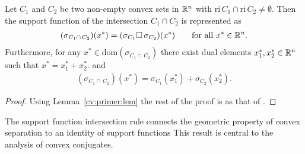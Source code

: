 \begin{theorem*}
  Let $C_1$ and $C_2$ be two non-empty convex sets in $\mathbb{R}^n$ with
  $\mathrm{ri}\,C_1\cap\mathrm{ri}\,C_2\neq\emptyset.$
  Then the support function of the intersection 
  $
    C_1\! \cap C_2
  $
  is represented as
  \begin{gather}
    (\sigma_{
    C_1 \cap\, C_2
    })
    (x^*)
    =
    (\sigma_{C_1}\square \,\sigma_{C_2})
    (x^*)
    \qquad
    \text{for all}\ 
    x^* \in \R^n.
  \end{gather}
  Furthermore, for any
  $
  x^*\in \mathrm{dom}
    (\sigma_{
    C_1 \cap\, C_2
    })
  $
  there exist dual elements 
  $
    x_1^*
    ,
    x_2^*
    \in \mathbb{R}^n
  $ 
  such that 
  $
    x^*
    =
    x_1^*
    +
    x_2^*.
  $
  and
  \begin{gather}
    (\sigma_{
    C_1 \cap\, C_2
    })
    (x^*)
    =
    \sigma_{C_1}(x_1^*)
    +
    \sigma_{C_2}(x_2^*).
  \end{gather}
\end{theorem*}
\begin{proof}
  Using Lemma~\ref{cv:primer:lem}
  the rest of the proof is as that of
  \emph{\cite[Theorem~4.23(b)]{Mordukhovich2022}}.
\end{proof}

\begin{takeaways}
  The support function intersection rule connects the geometric 
  property of convex separation to an identity of support functions
  This result is central to the analysis of convex conjugates.
\end{takeaways}

